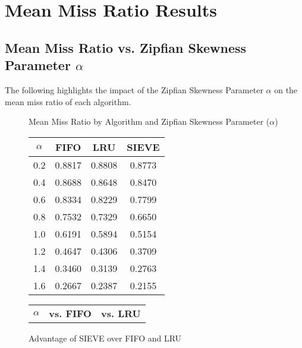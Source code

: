 \hfill
\section{Mean Miss Ratio Results}\label{appendix:mean-miss-ratio}

\subsection{Mean Miss Ratio vs. Zipfian Skewness Parameter $\alpha$}\label{appendix:miss-ratio-alpha}

The following  highlights the impact of the Zipfian Skewness Parameter $\alpha$ on the mean miss ratio of each algorithm.

\begin{figure}[h!]
    \centering
    \begin{minipage}[t]{0.47\textwidth}
        \centering
        \caption{Mean Miss Ratio by Algorithm and Zipfian Skewness Parameter ($\alpha$)}
        \label{tab: miss_ratio_by_alpha}
        \begin{tabular}{c c c c}
            \toprule
            \textbf{$\alpha$} & \textbf{FIFO} & \textbf{LRU} & \textbf{SIEVE} \\
            \midrule
            0.2 & 0.8817 & 0.8808 & 0.8773 \\
            0.4 & 0.8688 & 0.8648 & 0.8470 \\
            0.6 & 0.8334 & 0.8229 & 0.7799 \\
            0.8 & 0.7532 & 0.7329 & 0.6650 \\
            1.0 & 0.6191 & 0.5894 & 0.5154 \\
            1.2 & 0.4647 & 0.4306 & 0.3709 \\
            1.4 & 0.3460 & 0.3139 & 0.2763 \\
            1.6 & 0.2667 & 0.2387 & 0.2155 \\
            \bottomrule
        \end{tabular}
    \end{minipage}
    \hfill
    \begin{minipage}[t]{0.47\textwidth}
        \centering
        \caption{Advantage of SIEVE over FIFO and LRU}
        \label{tab: sieve_advantage}
        \begin{tabular}{l rr rr}
            \toprule
            \textbf{$\alpha$} & \multicolumn{2}{c}{\textbf{vs. FIFO}} & \multicolumn{2}{c}{\textbf{vs. LRU}} \\
            \cmidrule(lr){2-3} \cmidrule(lr){4-5}

\end{tabular}
\end{minipage}
\end{figure}
